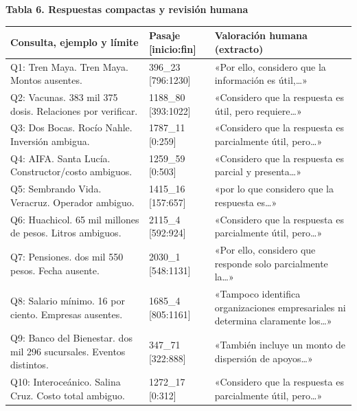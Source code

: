 \par\medskip\noindent\begin{minipage}{\linewidth}
\textbf{Tabla 6. Respuestas compactas y revisión humana}\par\smallskip
\begin{tabularx}{\linewidth}{@{}YYY@{}}\toprule
Consulta, ejemplo y límite & Pasaje [inicio:fin] & Valoración humana (extracto) \\ \midrule
Q1: Tren Maya. Tren Maya. Montos ausentes. & 396\_\allowbreak{}23 [796:1230] & «Por ello, considero que la información es útil,…» \\
Q2: Vacunas. 383 mil 375 dosis. Relaciones por verificar. & 1188\_\allowbreak{}80 [393:1022] & «Considero que la respuesta es útil, pero requiere…» \\
Q3: Dos Bocas. Rocío Nahle. Inversión ambigua. & 1787\_\allowbreak{}11 [0:259] & «Considero que la respuesta es parcialmente útil, pero…» \\
Q4: AIFA. Santa Lucía. Constructor/\allowbreak{}costo ambiguos. & 1259\_\allowbreak{}59 [0:503] & «Considero que la respuesta es parcial y presenta…» \\
Q5: Sembrando Vida. Veracruz. Operador ambiguo. & 1415\_\allowbreak{}16 [157:657] & «por lo que considero que la respuesta es…» \\
Q6: Huachicol. 65 mil millones de pesos. Litros ambiguos. & 2115\_\allowbreak{}4 [592:924] & «Considero que la respuesta es parcialmente útil, pero…» \\
Q7: Pensiones. dos mil 550 pesos. Fecha ausente. & 2030\_\allowbreak{}1 [548:1131] & «Por ello, considero que responde solo parcialmente la…» \\
Q8: Salario mínimo. 16 por ciento. Empresas ausentes. & 1685\_\allowbreak{}4 [805:1161] & «Tampoco identifica organizaciones empresariales ni determina claramente los…» \\
Q9: Banco del Bienestar. dos mil 296 sucursales. Eventos distintos. & 347\_\allowbreak{}71 [322:888] & «También incluye un monto de dispersión de apoyos…» \\
Q10: Interoceánico. Salina Cruz. Costo total ambiguo. & 1272\_\allowbreak{}17 [0:312] & «Considero que la respuesta es parcialmente útil, pero…» \\
\bottomrule\end{tabularx}\end{minipage}\par\medskip
